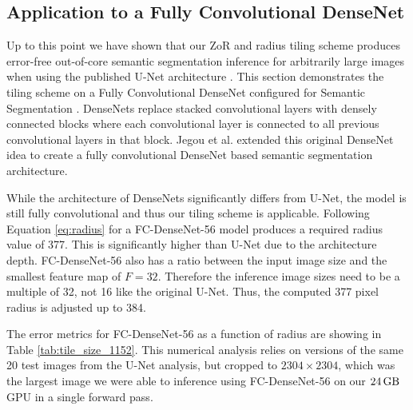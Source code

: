 \documentclass[runningheads]{llncs}
\begin{document}
\subsection{Application to a Fully Convolutional DenseNet}

Up to this point we have shown that our ZoR and radius tiling scheme produces error-free out-of-core semantic segmentation inference for arbitrarily large images when using the published U-Net architecture \cite{Ronneberger2015a}. 
This section demonstrates the tiling scheme on a Fully Convolutional DenseNet configured for Semantic Segmentation \cite{Jegou2017}. DenseNets \cite{Huang2017} replace stacked convolutional layers with densely connected blocks where each convolutional layer is connected to all previous convolutional layers in that block. Jegou et al. \cite{Jegou2017} extended this original DenseNet idea to create a fully convolutional DenseNet based semantic segmentation architecture. 

While the architecture of DenseNets significantly differs from U-Net, the model is still fully convolutional and thus our tiling scheme is applicable. Following Equation \ref{eq:radius} for a FC-DenseNet-56 \cite{Jegou2017} model produces a required radius value of 377. This is significantly higher than U-Net due to the architecture depth. FC-DenseNet-56 also has a ratio between the input image size and the smallest feature map of $F = 32$. Therefore the inference image sizes need to be a multiple of 32, not 16 like the original U-Net. Thus, the computed 377 pixel radius is adjusted up to 384. 

The error metrics for FC-DenseNet-56 as a function of radius are showing in Table \ref{tab:tile_size_1152}. This numerical analysis relies on versions of the same 20 test images from the U-Net analysis, but cropped to $\num{2304} \times \num{2304}$, which was the largest image we were able to inference using FC-DenseNet-56 on our $\SI{24}{\giga\byte}$ GPU in a single forward pass. 
\end{document}

